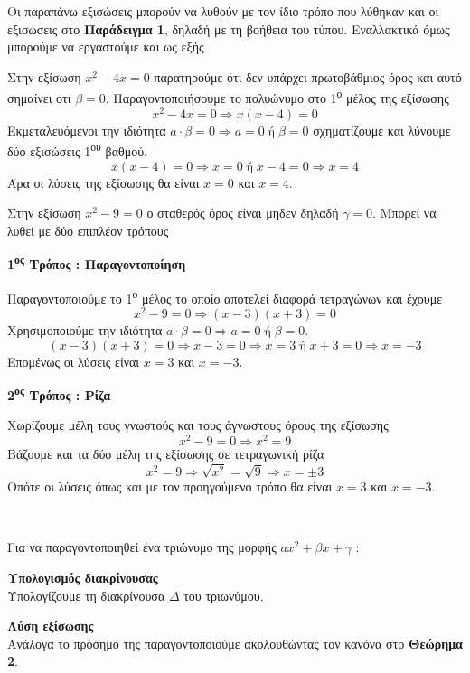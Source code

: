 \documentclass[twoside,nofonts,internet,methodoi]{thewria}
\newcommand{\tss}[1]{\textsuperscript{#1}}
\begin{document}
Οι παραπάνω εξισώσεις μπορούν να λυθούν με τον ίδιο τρόπο που λύθηκαν και οι εξισώσεις στο \textbf{Παράδειγμα 1}, δηλαδή με τη βοήθεια του τύπου. Εναλλακτικά όμως μπορούμε να εργαστούμε και ως εξής
\begin{rlist}
\item Στην εξίσωση $ x^2-4x=0 $ παρατηρούμε ότι δεν υπάρχει πρωτοβάθμιος όρος και αυτό σημαίνει οτι $ \beta=0 $. Παραγοντοποιήσουμε το πολυώνυμο στο 1\tss{ο} μέλος της εξίσωσης \[ x^2-4x=0\Rightarrow x(x-4)=0 \]
Εκμεταλευόμενοι την ιδιότητα $ a\cdot\beta=0\Rightarrow a=0\;\textrm{ή}\;\beta=0 $ σχηματίζουμε και λύνουμε δύο εξισώσεις 1\tss{ου} βαθμού.
\[ x(x-4)=0\Rightarrow x=0\;\textrm{ή}\;x-4=0\Rightarrow x=4 \]
Άρα οι λύσεις της εξίσωσης θα είναι $ x=0 $ και $ x=4 $.
\item Στην εξίσωση $ x^2-9=0 $ ο σταθερός όρος είναι μηδεν δηλαδή $ \gamma=0 $. Μπορεί να λυθεί με δύο επιπλέον τρόπους
\begin{center}
\textbf{1\tss{ος} Τρόπος : Παραγοντοποίηση}
\end{center}
Παραγοντοποιούμε το 1\tss{ο} μέλος το οποίο αποτελεί διαφορά τετραγώνων και έχουμε \[ x^2-9=0\Rightarrow (x-3)(x+3)=0 \]
Χρησιμοποιούμε την ιδιότητα $ a\cdot\beta=0\Rightarrow a=0\;\textrm{ή}\;\beta=0 $.
\[ (x-3)(x+3)=0\Rightarrow x-3=0\Rightarrow x=3\;\textrm{ή}\;x+3=0\Rightarrow x=-3 \]
Επομένως οι λύσεις είναι $ x=3 $ και $ x=-3 $.
\begin{center}
\textbf{2\tss{ος} Τρόπος : Ρίζα}
\end{center}
Χωρίζουμε μέλη τους γνωστούς και τους άγνωστους όρους της εξίσωσης \[ x^2-9=0\Rightarrow x^2=9 \]
Βάζουμε και τα δύο μέλη της εξίσωσης σε τετραγωνική ρίζα
\[ x^2=9\Rightarrow \sqrt{x^2}=\sqrt{9}\Rightarrow x=\pm3 \]
Οπότε οι λύσεις όπως και με τον προηγούμενο τρόπο θα είναι $ x=3 $ και $ x=-3 $.
\end{rlist}\mbox{}\\
\begin{Methodos}
Για να παραγοντοποιηθεί ένα τριώνυμο της μορφής $ ax^2+\beta x+\gamma $ :
\begin{bhma}
\item \textbf{Υπολογισμός διακρίνουσας}\\
Υπολογίζουμε τη διακρίνουσα $ \varDelta $ του τριωνύμου.
\item \textbf{Λύση εξίσωσης}\\
Ανάλογα το πρόσημο της παραγοντοποιούμε ακολουθώντας τον κανόνα στο \textbf{Θεώρημα 2}.
\end{bhma}
\end{Methodos}
\end{document}

